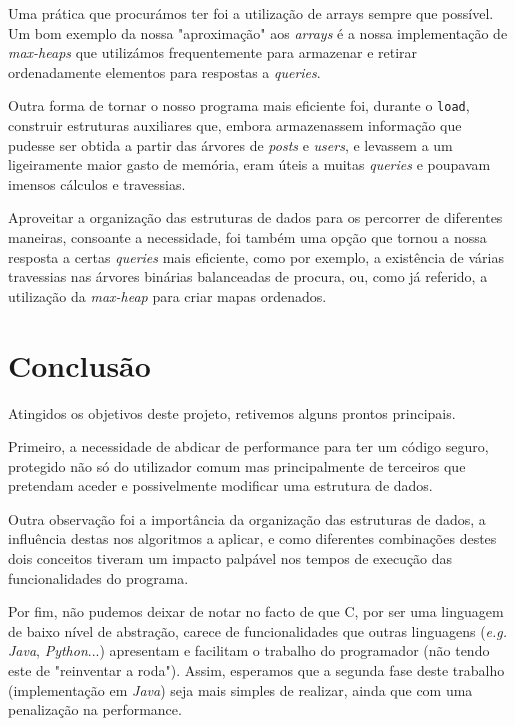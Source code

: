 \documentclass[10pt]{article}
\begin{document}
		Uma prática que procurámos ter foi a utilização de arrays sempre que possível. Um bom 
	exemplo da nossa "aproximação" aos \textit{arrays} é a nossa implementação de \textit{max-heaps} 
	que utilizámos frequentemente para armazenar e retirar ordenadamente elementos para respostas 
	a \textit{queries}.
	
		Outra forma de tornar o nosso programa mais eficiente foi, durante o \texttt{load},
	construir estruturas auxiliares que, embora armazenassem informação que pudesse ser obtida
	a partir das árvores de \textit{posts} e \textit{users}, e levassem a um ligeiramente maior
	gasto de memória, eram úteis a muitas \textit{queries} e poupavam imensos cálculos e travessias.
	
		Aproveitar a organização das estruturas de dados para os percorrer de diferentes maneiras,
	consoante a necessidade, foi também uma opção que tornou a nossa resposta a certas 
	\textit{queries} mais eficiente, como por exemplo, a existência de várias travessias nas 
	árvores binárias balanceadas de procura, ou, como já referido, a utilização da \textit{max-heap}
	para criar mapas ordenados.

\section{Conclusão}
	Atingidos os objetivos deste projeto, retivemos alguns prontos principais.
	
	Primeiro, a necessidade de abdicar de performance para ter um código seguro,
protegido não só do utilizador comum mas principalmente de terceiros que pretendam 
aceder e possivelmente modificar uma estrutura de dados.

	Outra observação foi a importância da organização das estruturas de dados, a 
influência destas nos algoritmos a aplicar, e como diferentes combinações
destes dois conceitos tiveram um impacto palpável nos tempos de execução das
funcionalidades do programa.	
	
	Por fim, não pudemos deixar de notar no facto de que C, por ser uma linguagem 
de baixo nível de abstração, carece de funcionalidades que outras linguagens
(\textit{e.g.} \textit{Java}, \textit{Python}...) apresentam e facilitam o trabalho do
programador (não tendo este de "reinventar a roda"). Assim, esperamos que a segunda fase deste trabalho (implementação
em \textit{Java}) seja mais simples de realizar, ainda que com uma penalização na performance.
\end{document}
